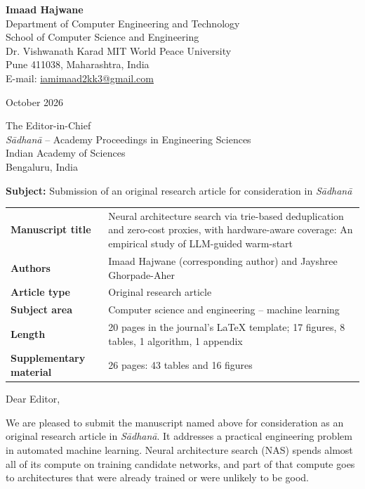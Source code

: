 \documentclass[11pt,a4paper]{article}
\newcommand{\sadhana}{\textit{S\=adhan\=a}}
\begin{document}
\begin{minipage}[t]{0.62\textwidth}
\textbf{Imaad Hajwane}\\
Department of Computer Engineering and Technology\\
School of Computer Science and Engineering\\
Dr. Vishwanath Karad MIT World Peace University\\
Pune 411038, Maharashtra, India\\
E-mail: \href{mailto:iamimaad2kk3@gmail.com}{iamimaad2kk3@gmail.com}
\end{minipage}\hfill
\begin{minipage}[t]{0.3\textwidth} October 2026
\end{minipage}

\vspace{4pt}{\color{rule}\rule{\textwidth}{0.4pt}}

The Editor-in-Chief\\
\sadhana{} -- Academy Proceedings in Engineering Sciences\\
Indian Academy of Sciences\\
Bengaluru, India

\textbf{Subject:} Submission of an original research article for consideration in \sadhana

\vspace{2pt}
{\small
\begin{tabular}{@{}>{\bfseries}p{}p{}@{}}
\toprule
Manuscript title & Neural architecture search via trie-based deduplication and zero-cost proxies, with hardware-aware coverage: An empirical study of LLM-guided warm-start\\
Authors & Imaad Hajwane (corresponding author) and Jayshree Ghorpade-Aher\\
Article type & Original research article\\
Subject area & Computer science and engineering -- machine learning\\
Length & 20 pages in the journal's \LaTeX{} template; 17 figures, 8 tables, 1 algorithm, 1 appendix\\
Supplementary material & 26 pages: 43 tables and 16 figures\\
\bottomrule
\end{tabular}}

Dear Editor,

We are pleased to submit the manuscript named above for consideration as an original research article in \sadhana. It addresses a practical engineering problem in automated machine learning. Neural architecture search (NAS) spends almost all of its compute on training candidate networks, and part of that compute goes to architectures that were already trained or were unlikely to be good.
\end{document}
